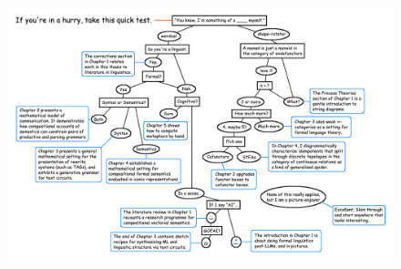 


\thispagestyle{empty}%
\maketitle%

\clearpage
\newpage
\clearpage
\newpage

\begin{figure}
    \centering
    \includegraphics[width=1.5\linewidth]{figures/thesismap1.png}
\end{figure}
\clearpage

\tableofcontents


